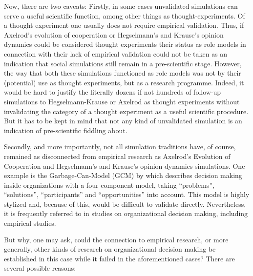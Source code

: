 \documentclass[12pt, a4paper]{article}
\begin{document}
Now, there are two caveats: Firstly, in some cases unvalidated
simulations can serve a useful scientific function, among other things
as thought-experiments. Of a thought experiment one usually does not
require empirical validation. Thus, if Axelrod's evolution of
cooperation or Hegselmann's and Krause's opinion dynamics could be
considered thought experiments their status as role models in
connection with their lack of empirical validation could not be taken
as an indication that social simulations still remain in a
pre-scientific stage. However, the way that both these simulations
functioned as role models was not by their (potential) use as thought
experiments, but as a research programme. Indeed, it would be hard to
justify the literally dozens if not hundreds of follow-up simulations
to Hegselmann-Krause or Axelrod as thought experiments without
invalidating the category of a thought experiment as a useful
scientific procedure. But it has to be kept in mind that not any kind
of unvalidated simulation is an indication of pre-scientific fiddling
about.

Secondly, and more importantly, not all simulation traditions have, of
course, remained as disconnected from empirical research as Axelrod's
Evolution of Cooperation and Hegselmann's and Krause's opinion
dynamics simulations. One example is the Garbage-Can-Model (GCM) by
\citet{cohen-et-al:1972} which describes decision making inside
organizations with a four component model, taking ``problems'',
``solutions'', ``participants'' and ``opportunities'' into account.
This model is highly stylized and, because of this, would be difficult
to validate directly. Nevertheless, it is frequently referred to in
studies on organizational decision making, including empirical
studies.

But why, one may ask, could the connection to empirical research, or
more generally, other kinds of research on organizational decision
making be established in this case while it failed in the
aforementioned cases? There are several possible reasons:
\end{document}
